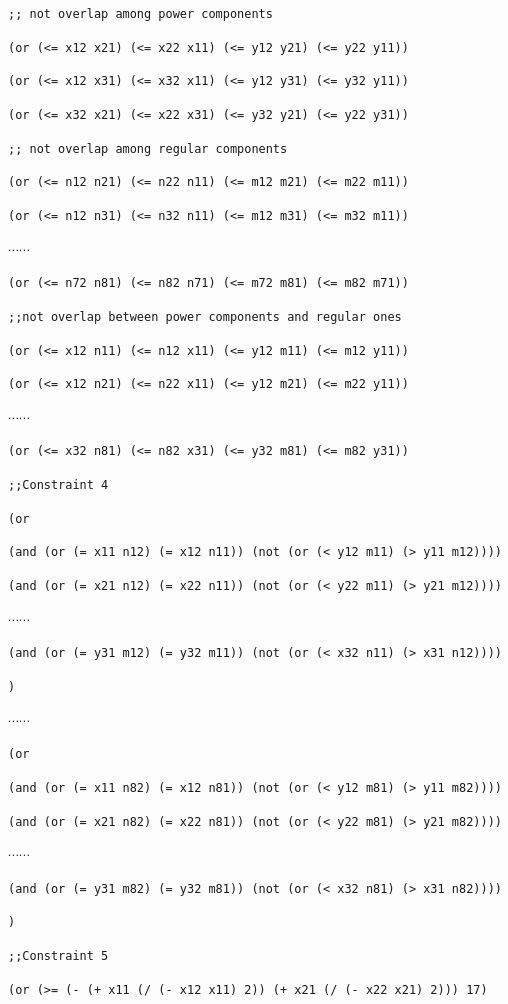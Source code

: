 \documentclass[11pt]{article}
\begin{document}
{{\tt ;; not overlap among power components}

{\tt (or (<= x12 x21) (<= x22 x11) (<= y12 y21) (<= y22 y11))}

{\tt (or (<= x12 x31) (<= x32 x11) (<= y12 y31) (<= y32 y11))}

{\tt (or (<= x32 x21) (<= x22 x31) (<= y32 y21) (<= y22 y31))}

{\tt ;; not overlap among regular components}

{\tt (or (<= n12 n21) (<= n22 n11) (<= m12 m21) (<= m22 m11))}

{\tt (or (<= n12 n31) (<= n32 n11) (<= m12 m31) (<= m32 m11))}

$\cdots \cdots$

{\tt (or (<= n72 n81) (<= n82 n71) (<= m72 m81) (<= m82 m71))}

{\tt ;;not overlap between power components and regular ones}

{\tt (or (<= x12 n11) (<= n12 x11) (<= y12 m11) (<= m12 y11))}

{\tt (or (<= x12 n21) (<= n22 x11) (<= y12 m21) (<= m22 y11))}

$\cdots \cdots$

{\tt (or (<= x32 n81) (<= n82 x31) (<= y32 m81) (<= m82 y31))}

{\tt ;;Constraint 4}

{\tt (or}

{\tt (and (or (= x11 n12) (= x12 n11)) (not (or (< y12 m11) (> y11 m12))))}

{\tt (and (or (= x21 n12) (= x22 n11)) (not (or (< y22 m11) (> y21 m12))))}

$\cdots \cdots$

{\tt (and (or (= y31 m12) (= y32 m11)) (not (or (< x32 n11) (> x31 n12))))}

{\tt )}

$\cdots \cdots$

{\tt (or}

{\tt (and (or (= x11 n82) (= x12 n81)) (not (or (< y12 m81) (> y11 m82))))}

{\tt (and (or (= x21 n82) (= x22 n81)) (not (or (< y22 m81) (> y21 m82))))}

$\cdots \cdots$

{\tt (and (or (= y31 m82) (= y32 m81)) (not (or (< x32 n81) (> x31 n82))))}

{\tt )}

{\tt ;;Constraint 5}

{\tt (or (>= (- (+ x11 (/ (- x12 x11) 2)) (+ x21 (/ (- x22 x21) 2))) 17)}

}
\end{document}
